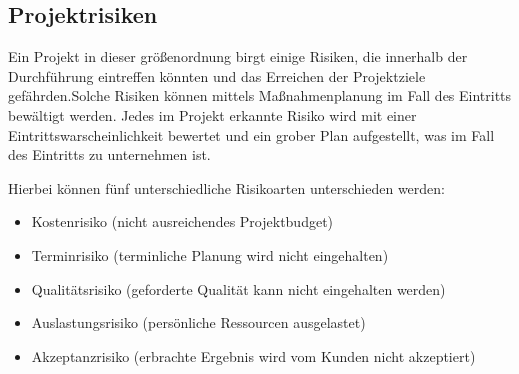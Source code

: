 \subsection{Projektrisiken}
\label{sec:Projektrisiken}

Ein Projekt in dieser größenordnung birgt einige Risiken, die
innerhalb der Durchführung eintreffen könnten und das Erreichen der
Projektziele gefährden.Solche Risiken können mittels Maßnahmenplanung im Fall
des Eintritts bewältigt werden. Jedes im Projekt erkannte Risiko wird mit einer
Eintrittswarscheinlichkeit bewertet und ein grober Plan aufgestellt, was im Fall
des Eintritts zu unternehmen ist.

Hierbei können fünf unterschiedliche Risikoarten unterschieden
werden:

\begin{itemize}
  \item Kostenrisiko (nicht ausreichendes Projektbudget)
  \item Terminrisiko (terminliche Planung wird nicht eingehalten)
  \item Qualitätsrisiko (geforderte Qualität kann nicht eingehalten werden)
  \item Auslastungsrisiko (persönliche Ressourcen ausgelastet)
  \item Akzeptanzrisiko (erbrachte Ergebnis wird vom Kunden nicht akzeptiert)
\end{itemize}



